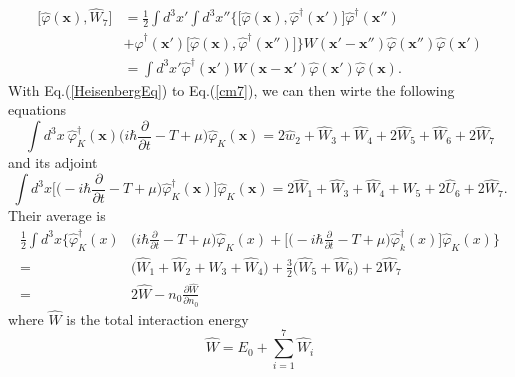 \documentclass[12pt]{article}
\begin{document}
\begin{equation}\label{cm7}
    \begin{split}
        \big[\hat{\varphi}(\mathbf{x}),\hat{W}_7\big]&=\frac{1}{2}\int d^3x'\int
        d^3x''\big\{\big[\hat{\varphi}(\mathbf{x}),\hat{\varphi}^\dagger(\mathbf{x}')
        \big]\hat{\varphi}^\dagger(\mathbf{x}'')\\
        &+\hat{\varphi}^\dagger(\mathbf{x}')\big[\hat{\varphi}(\mathbf{x}),
        \hat{\varphi}^\dagger(\mathbf{x}'')\big]\big\}W(\mathbf{x}'-\mathbf{x}'')
        \hat{\varphi}(\mathbf{x}'')\hat{\varphi}(\mathbf{x}')\\
        &=\int d^3x'\hat{\varphi}^\dagger(\mathbf{x}')W(\mathbf{x}-\mathbf{x}')
        \hat{\varphi}(\mathbf{x}')\hat{\varphi}(\mathbf{x}).
    \end{split}
\end{equation}
With Eq.(\ref{HeisenbergEq}) to Eq.(\ref{cm7}), we can then wirte the following 
equations
\begin{equation}
    \int d^3x\ \hat{\varphi}_K^\dagger(\mathbf{x})\Big(i\hbar\frac{\partial}{\partial 
    t}-T+\mu\Big)\hat{\varphi}_K(\mathbf{x})=2\hat{w}_2+\hat{W}_3+\hat{W}_4+2\hat{W}_5
    +\hat{W}_6+2\hat{W}_7
\end{equation}
and its adjoint 
\begin{equation}
    \int d^3x\Big[\Big(-i\hbar\frac{\partial}{\partial t}-T+\mu\Big)\hat{\varphi}_K
    ^\dagger(\mathbf{x})\Big]\hat{\varphi}_K(\mathbf{x})=2\hat{W}_1+\hat{W}_3+
    \hat{W}_4+\hat{W}_5+2\hat{U}_6+2\hat{W}_7.
\end{equation}
Their average is 
\begin{equation}\label{average}
    \begin{aligned}
        \frac{1}{2} \int d^{3} x\Big\{\hat{\varphi}_{K}^{\dagger}(x)&\Big(i\hbar
        \frac{\partial}{\partial t}-T+\mu\Big)\hat{\varphi}_{K}(x)+\Big[\Big(-i\hbar
        \frac{\partial}{\partial t}-T+\mu\Big)\hat{\varphi}_{k}^{\dagger}(x)\Big]
        \hat{\varphi}_{K}(x)\Big\} \\
        =&\big(\hat{W}_1+\hat{W}_2+\hat{W}_3+\hat{W}_4\big)+\frac{3}{2}\big(\hat{W}_5
        +\hat{W}_6\big)+2\hat{W}_7\\
        =&2\hat{W}-n_0\frac{\partial\hat{W}}{\partial n_0}
        \end{aligned}
\end{equation}
where $\hat{W}$ is the total interaction energy 
\begin{equation}
    \hat{W}=E_0+\sum_{i=1}^7\hat{W}_i
\end{equation}
\hrulefill
\end{document}
